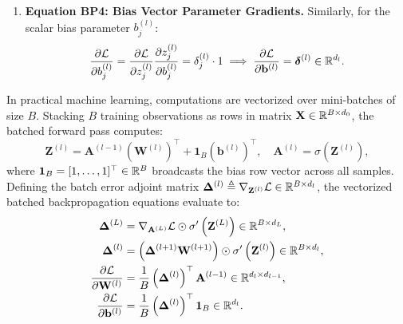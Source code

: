 \begin{enumerate}[noitemsep,topsep=2pt,parsep=0pt,partopsep=0pt]
  \item \textbf{Equation BP4: Bias Vector Parameter Gradients.}
  Similarly, for the scalar bias parameter $b_j^{(l)}$:
  \begin{equation}
  \frac{\partial \mathcal{L}}{\partial b_j^{(l)}} = \frac{\partial \mathcal{L}}{\partial z_j^{(l)}} \frac{\partial z_j^{(l)}}{\partial b_j^{(l)}} = \delta_j^{(l)} \cdot 1 \implies \frac{\partial \mathcal{L}}{\partial \mathbf{b}^{(l)}} = \boldsymbol{\delta}^{(l)} \in \mathbb{R}^{d_l}.
  \label{eq:bp4_bias_gradient}
  \end{equation}
\end{enumerate}

In practical machine learning, computations are vectorized over mini-batches of size $B$. Stacking $B$ training observations as rows in matrix $\mathbf{X} \in \mathbb{R}^{B \times d_0}$, the batched forward pass computes:
\begin{equation}
\mathbf{Z}^{(l)} = \mathbf{A}^{(l-1)} (\mathbf{W}^{(l)})^\top + \mathbf{1}_B (\mathbf{b}^{(l)})^\top, \quad \mathbf{A}^{(l)} = \sigma\left( \mathbf{Z}^{(l)} \right),
\label{eq:batched_forward_equations}
\end{equation}
where $\mathbf{1}_B = [1, \dots, 1]^\top \in \mathbb{R}^B$ broadcasts the bias row vector across all samples. Defining the batch error adjoint matrix $\boldsymbol{\Delta}^{(l)} \triangleq \nabla_{\mathbf{Z}^{(l)}} \mathcal{L} \in \mathbb{R}^{B \times d_l}$, the vectorized batched backpropagation equations evaluate to:
\begin{align}
\boldsymbol{\Delta}^{(L)} &= \nabla_{\mathbf{A}^{(L)}} \mathcal{L} \odot \sigma'\left( \mathbf{Z}^{(L)} \right) \in \mathbb{R}^{B \times d_L}, \label{eq:batched_bp1} \\
\boldsymbol{\Delta}^{(l)} &= \left( \boldsymbol{\Delta}^{(l+1)} \mathbf{W}^{(l+1)} \right) \odot \sigma'\left( \mathbf{Z}^{(l)} \right) \in \mathbb{R}^{B \times d_l}, \label{eq:batched_bp2} \\
\frac{\partial \mathcal{L}}{\partial \mathbf{W}^{(l)}} &= \frac{1}{B} \left( \boldsymbol{\Delta}^{(l)} \right)^\top \mathbf{A}^{(l-1)} \in \mathbb{R}^{d_l \times d_{l-1}}, \label{eq:batched_bp3} \\
\frac{\partial \mathcal{L}}{\partial \mathbf{b}^{(l)}} &= \frac{1}{B} \left( \boldsymbol{\Delta}^{(l)} \right)^\top \mathbf{1}_B \in \mathbb{R}^{d_l}. \label{eq:batched_bp4}
\end{align}

